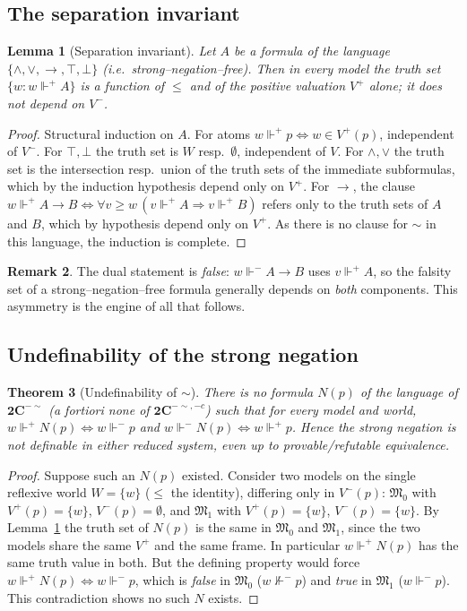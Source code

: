 \documentclass{amsart}
\theoremstyle{plain}
\newtheorem{theorem}{Theorem}
\newtheorem{lemma}[theorem]{Lemma}
\theoremstyle{definition}
\newtheorem{remark}[theorem]{Remark}
\newcommand{\To}{\rightarrow}
\newcommand{\Ci}{\mathbf{2C}^{-{\sim}}}        %
\newcommand{\Cii}{\mathbf{2C}^{-{\sim},-c}}    %
\newcommand{\fp}{\Vdash^{+}}
\newcommand{\fm}{\Vdash^{-}}
\begin{document}
\subsection{The separation invariant}

\begin{lemma}[Separation invariant]\label{lem:sep}
Let $A$ be a formula of the language $\{\wedge,\vee,\To,\top,\bot\}$ (i.e.\
strong--negation--free). Then in every model the truth set $\{w:w\fp A\}$ is a
function of $\le$ and of the positive valuation $V^{+}$ alone; it does not depend
on $V^{-}$.
\end{lemma}
\begin{proof}
Structural induction on $A$. For atoms $w\fp p\iff w\in V^{+}(p)$, independent of
$V^{-}$. For $\top,\bot$ the truth set is $W$ resp.\ $\emptyset$, independent of
$V$. For $\wedge,\vee$ the truth set is the intersection resp.\ union of the
truth sets of the immediate subformulas, which by the induction hypothesis depend
only on $V^{+}$. For $\To$, the clause
$w\fp A\To B\iff\forall v\ge w\,(v\fp A\Rightarrow v\fp B)$ refers only to the
truth sets of $A$ and $B$, which by hypothesis depend only on $V^{+}$. As there
is no clause for ${\sim}$ in this language, the induction is complete.
\end{proof}

\begin{remark}\label{rem:nofalse}
The dual statement is \emph{false}: $w\fm A\To B$ uses $v\fp A$, so the falsity
set of a strong--negation--free formula generally depends on \emph{both}
components. This asymmetry is the engine of all that follows.
\end{remark}

\subsection{Undefinability of the strong negation}

\begin{theorem}[Undefinability of ${\sim}$]\label{thm:undefneg}
There is no formula $N(p)$ of the language of $\Ci$ (a fortiori none of $\Cii$)
such that for every model and world, $w\fp N(p)\iff w\fm p$ and $w\fm N(p)\iff
w\fp p$. Hence the strong negation is not definable in either reduced system,
even up to provable/refutable equivalence.
\end{theorem}
\begin{proof}
Suppose such an $N(p)$ existed. Consider two models on the single reflexive world
$W=\{w\}$ ($\le$ the identity), differing only in $V^{-}(p)$:
$\mathfrak{M}_{0}$ with $V^{+}(p)=\{w\}$, $V^{-}(p)=\emptyset$, and
$\mathfrak{M}_{1}$ with $V^{+}(p)=\{w\}$, $V^{-}(p)=\{w\}$. By
Lemma~\ref{lem:sep} the truth set of $N(p)$ is the same in $\mathfrak{M}_{0}$ and
$\mathfrak{M}_{1}$, since the two models share the same $V^{+}$ and the same
frame. In particular $w\fp N(p)$ has the same truth value in both. But the
defining property would force $w\fp N(p)\iff w\fm p$, which is \emph{false} in
$\mathfrak{M}_{0}$ ($w\not\fm p$) and \emph{true} in $\mathfrak{M}_{1}$
($w\fm p$). This contradiction shows no such $N$ exists.
\end{proof}
\end{document}
